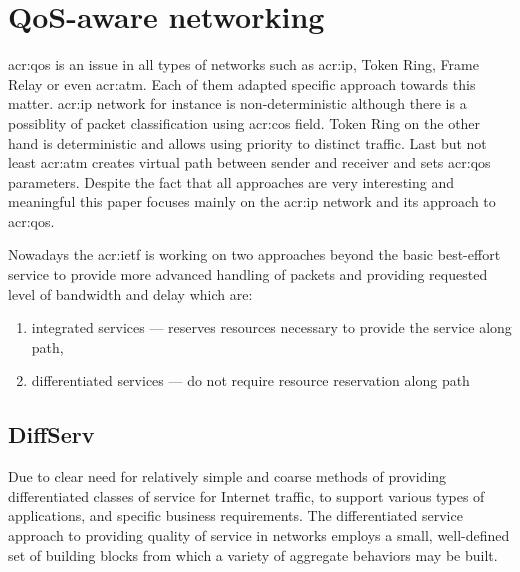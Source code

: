 \documentclass[11pt,openany]{book}
\begin{document}
    \section{QoS-aware networking}
    \label{sec:ctx:qos}


      \gls{acr:qos} is an issue in all types of networks such as \gls{acr:ip}, Token Ring, Frame Relay or even
      \gls{acr:atm}.  Each of them adapted specific approach towards this matter. \gls{acr:ip} network for instance is
      non-deterministic although there is a possiblity of packet classification using \gls{acr:cos} field. Token Ring on
      the other hand is deterministic and allows using priority to distinct traffic. Last but not least \gls{acr:atm}
      creates virtual path between sender and receiver and sets \gls{acr:qos} parameters. Despite the fact that all
      approaches are very interesting and meaningful this paper focuses mainly on the \gls{acr:ip} network and its
      approach to \gls{acr:qos}.


      Nowadays the \gls{acr:ietf} is working on two approaches beyond the basic best-effort service to provide more
      advanced handling of packets and providing requested level of bandwidth and delay which are:

      \begin{enumerate}
        \item integrated services --- reserves resources necessary to provide the service along path,
        \item differentiated services --- do not require resource reservation along path
      \end{enumerate}


      \subsection{DiffServ}

        Due to clear need for relatively simple and coarse methods of providing differentiated classes of service for
        Internet traffic, to support various types of applications, and specific business requirements. The
        differentiated service approach to providing quality of service in networks employs a small, well-defined set of
        building blocks from which a variety of aggregate behaviors may be built. \cite{qos}
\end{document}
